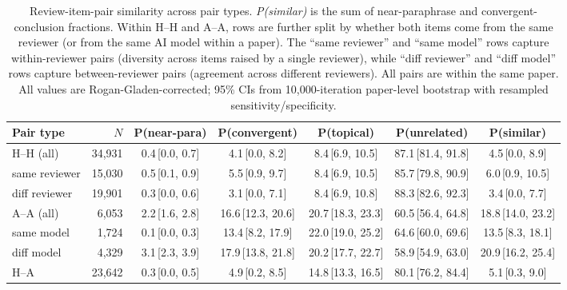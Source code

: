 \begin{table}[t]
\centering
\fontsize{7.5}{9.5}\selectfont
\setlength{\tabcolsep}{3pt}
\begin{tabular}{l r cccc c}
\toprule
\textbf{Pair type} & \textbf{$N$} & \textbf{P(near-para)} & \textbf{P(convergent)} & \textbf{P(topical)} & \textbf{P(unrelated)} & \textbf{P(similar)} \\
\midrule
H--H (all) & 34,931 & 0.4{\scriptsize\,[0.0, 0.7]} & 4.1{\scriptsize\,[0.0, 8.2]} & 8.4{\scriptsize\,[6.9, 10.5]} & 87.1{\scriptsize\,[81.4, 91.8]} & 4.5{\scriptsize\,[0.0, 8.9]} \\
\quad same reviewer & 15,030 & 0.5{\scriptsize\,[0.1, 0.9]} & 5.5{\scriptsize\,[0.9, 9.7]} & 8.4{\scriptsize\,[6.9, 10.5]} & 85.7{\scriptsize\,[79.8, 90.9]} & 6.0{\scriptsize\,[0.9, 10.5]} \\
\quad diff reviewer & 19,901 & 0.3{\scriptsize\,[0.0, 0.6]} & 3.1{\scriptsize\,[0.0, 7.1]} & 8.4{\scriptsize\,[6.9, 10.8]} & 88.3{\scriptsize\,[82.6, 92.3]} & 3.4{\scriptsize\,[0.0, 7.7]} \\
\midrule
A--A (all) & 6,053 & 2.2{\scriptsize\,[1.6, 2.8]} & 16.6{\scriptsize\,[12.3, 20.6]} & 20.7{\scriptsize\,[18.3, 23.3]} & 60.5{\scriptsize\,[56.4, 64.8]} & 18.8{\scriptsize\,[14.0, 23.2]} \\
\quad same model & 1,724 & 0.1{\scriptsize\,[0.0, 0.3]} & 13.4{\scriptsize\,[8.2, 17.9]} & 22.0{\scriptsize\,[19.0, 25.2]} & 64.6{\scriptsize\,[60.0, 69.6]} & 13.5{\scriptsize\,[8.3, 18.1]} \\
\quad diff model & 4,329 & 3.1{\scriptsize\,[2.3, 3.9]} & 17.9{\scriptsize\,[13.8, 21.8]} & 20.2{\scriptsize\,[17.7, 22.7]} & 58.9{\scriptsize\,[54.9, 63.0]} & 20.9{\scriptsize\,[16.2, 25.4]} \\
\midrule
H--A & 23,642 & 0.3{\scriptsize\,[0.0, 0.5]} & 4.9{\scriptsize\,[0.2, 8.5]} & 14.8{\scriptsize\,[13.3, 16.5]} & 80.1{\scriptsize\,[76.2, 84.4]} & 5.1{\scriptsize\,[0.3, 9.0]} \\
\bottomrule
\end{tabular}
\caption{Review-item-pair similarity across pair types. \textit{P(similar)} is the sum of near-paraphrase and convergent-conclusion fractions. Within H--H and A--A, rows are further split by whether both items come from the same reviewer (or from the same AI model within a paper). The ``same reviewer'' and ``same model'' rows capture within-reviewer pairs (diversity across items raised by a single reviewer), while ``diff reviewer'' and ``diff model'' rows capture between-reviewer pairs (agreement across different reviewers). All pairs are within the same paper. All values are Rogan-Gladen-corrected; 95\% CIs from 10{,}000-iteration paper-level bootstrap with resampled sensitivity/specificity.}
\label{tab:similarity-headline}
\end{table}
